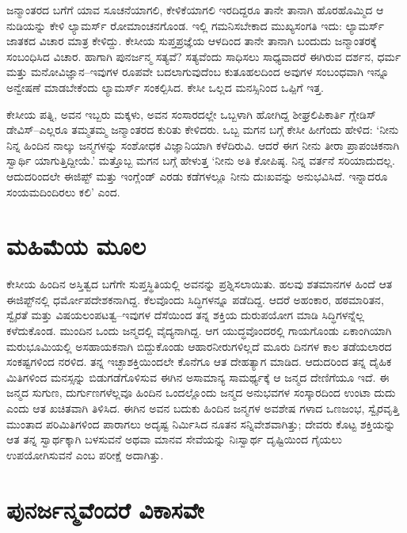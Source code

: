 ಜನ್ಮಾಂತರದ ಬಗೆಗೆ ಯಾವ ಸೂಚನೆಯಾಗಲಿ, ಕೇಳಿಕೆಯಾಗಲಿ ಇರದಿದ್ದರೂ ತಾನೇ ತಾನಾಗಿ ಹೊರಹೊಮ್ಮಿದ ಆ ನುಡಿಯನ್ನು ಕೇಳಿ ಲ್ಯಾಮರ್ಸ್ ರೋಮಾಂಚನಗೊಂಡ. ಇಲ್ಲಿ ಗಮನಿಸಬೇಕಾದ ಮುಖ್ಯಸಂಗತಿ ಇದು: ಲ್ಯಾಮರ್ಸ್ ಜಾತಕದ ವಿಚಾರ ಮಾತ್ರ ಕೇಳಿದ್ದು. ಕೇಸೀಯ ಸುಪ್ತಪ್ರಜ್ಞೆಯ ಆಳದಿಂದ ತಾನೇ ತಾನಾಗಿ ಬಂದುದು ಜನ್ಮಾಂತರಕ್ಕೆ ಸಂಬಂಧಿಸಿದ ವಿಚಾರ. ಹಾಗಾಗಿ ಪುನರ್ಜನ್ಮ ಸತ್ಯವೆ? ಸತ್ಯವೆಂದು ಸಾಧಿಸಲು ಸಾಧ್ಯವಾದರೆ ಈಗಿರುವ ದರ್ಶನ, ಧರ್ಮ ಮತ್ತು ಮನೋವಿಜ್ಞಾನ–ಇವುಗಳ ರೂಪವೇ ಬದಲಾಗುವುದೆಂಬ ಕುತೂಹಲದಿಂದ ಅವುಗಳ ಸಂಬಂಧವಾಗಿ ಇನ್ನೂ ಅನ್ವೇಷಣೆ ಮಾಡಬೇಕೆಂದು ಲ್ಯಾಮರ್ಸ್ ಸಂಕಲ್ಪಿಸಿದ. ಕೇಸೀ ಒಲ್ಲದ ಮನಸ್ಸಿನಿಂದ ಒಪ್ಪಿಗೆ ಇತ್ತ.

ಕೇಸೀಯ ಪತ್ನಿ, ಅವನ ಇಬ್ಬರು ಮಕ್ಕಳು, ಅವನ ಸಂಸಾರದಲ್ಲೇ ಒಬ್ಬಳಾಗಿ ಹೋಗಿದ್ದ ಶೀಘ್ರಲಿಪಿಕಾರ್ತಿ ಗ್ಲೇಡಿಸ್ ಡೇವಿಸ್​–ಎಲ್ಲರೂ ತಮ್ಮತಮ್ಮ ಜನ್ಮಾಂತರದ ಕುರಿತು ಕೇಳಿದರು. ಒಬ್ಬ ಮಗನ ಬಗ್ಗೆ ಕೇಸೀ ಹೀಗೆಂದು ಹೇಳಿದ: ‘ನೀನು ನಿನ್ನ ಹಿಂದಿನ ನಾಲ್ಕು ಜನ್ಮಗಳನ್ನು ಸಂಶೋಧಕ ವಿಜ್ಞಾನಿಯಾಗಿ ಕಳೆದಿರುವಿ. ಆದರೆ ಈಗ ನೀನು ತೀರಾ ಪ್ರಾಪಂಚಿಕನಾಗಿ ಸ್ವಾರ್ಥಿ ಯಾಗುತ್ತಿದ್ದೀಯೆ.’ ಮತ್ತೊಬ್ಬ ಮಗನ ಬಗ್ಗೆ ಹೇಳುತ್ತ ‘ನೀನು ಅತಿ ಕೋಪಿಷ್ಠ. ನಿನ್ನ ವರ್ತನೆ ಸರಿಯಾದುದಲ್ಲ. ಆದುದರಿಂದಲೇ ಈಜಿಪ್ಟ್ ಮತ್ತು ಇಂಗ್ಲೆಂಡ್ ಎರಡು ಕಡೆಗಳಲ್ಲೂ ನೀನು ದುಃಖವನ್ನು ಅನುಭವಿಸಿದೆ. ಇನ್ನಾದರೂ ಸಂಯಮದಿಂದಿರಲು ಕಲಿ’ ಎಂದ.


\section{ಮಹಿಮೆಯ ಮೂಲ}

ಕೇಸೀಯ ಹಿಂದಿನ ಅಸ್ತಿತ್ವದ ಬಗೆಗೇ ಸುಪ್ತಸ್ಥಿತಿಯಲ್ಲಿ ಅವನನ್ನು ಪ್ರಶ್ನಿಸಲಾಯಿತು. ಹಲವು ಶತಮಾನಗಳ ಹಿಂದೆ ಆತ ಈಜಿಪ್ಟ್​ನಲ್ಲಿ ಧರ್ಮೋಪದೇಶಕನಾಗಿದ್ದ. ಕೆಲವೊಂದು ಸಿದ್ಧಿಗಳನ್ನೂ ಪಡೆದಿದ್ದ. ಆದರೆ ಅಹಂಕಾರ, ಹಠಮಾರಿತನ, ಸ್ವೈರತೆ ಮತ್ತು ವಿಷಯಲಂಪಟತ್ವ–ಇವುಗಳ ದೆಸೆಯಿಂದ ತನ್ನ ಶಕ್ತಿಯ ದುರುಪಯೋಗ ಮಾಡಿ ಸಿದ್ಧಿಗಳನ್ನೆಲ್ಲ ಕಳೆದುಕೊಂಡ. ಮುಂದಿನ ಒಂದು ಜನ್ಮದಲ್ಲಿ ವೈದ್ಯನಾಗಿದ್ದ. ಆಗ ಯುದ್ಧವೊಂದರಲ್ಲಿ ಗಾಯಗೊಂಡು ಏಕಾಂಗಿಯಾಗಿ ಮರುಭೂಮಿಯಲ್ಲಿ ಅಸಹಾಯಕನಾಗಿ ಬಿದ್ದುಕೊಂಡು ಆಹಾರನೀರುಗಳಿಲ್ಲದೆ ಮೂರು ದಿನಗಳ ಕಾಲ ತಡೆಯಲಾರದ ಸಂಕಷ್ಟಗಳಿಂದ ನರಳಿದ. ತನ್ನ ಇಚ್ಛಾಶಕ್ತಿಯಿಂದಲೇ ಕೊನೆಗೂ ಆತ ದೇಹತ್ಯಾಗ ಮಾಡಿದ. ಆದುದರಿಂದ ತನ್ನ ದೈಹಿಕ ಮಿತಿಗಳಿಂದ ಮನಸ್ಸನ್ನು ಬಿಡುಗಡೆಗೊಳಿಸುವ ಈಗಿನ ಅಸಾಮಾನ್ಯ ಸಾಮರ್ಥ್ಯಕ್ಕೆ ಆ ಜನ್ಮದ ದೇಣಿಗೆಯೂ ಇದೆ. ಈ ಜನ್ಮದ ಸುಗುಣ, ದುರ್ಗುಣಗಳೆಲ್ಲವೂ ಹಿಂದಿನ ಒಂದಲ್ಲೊಂದು ಜನ್ಮದ ಅನುಭವಗಳ ಸಂಸ್ಕಾರದಿಂದ ಉಂಟಾ ದುದು ಎಂದು ಆತ ಖಚಿತವಾಗಿ ತಿಳಿಸಿದ. ಈಗಿನ ಅವನ ಬದುಕು ಹಿಂದಿನ ಜನ್ಮಗಳ ಅವಶೇಷ ಗಳಾದ ಒಣಜಂಭ, ಸ್ವೈರವೃತ್ತಿ ಮುಂತಾದ ಪರಿಮಿತಿಗಳಿಂದ ಪಾರಾಗಲು ಅದೃಷ್ಟ ನಿರ್ಮಿಸಿದ ನೂತನ ಸನ್ನಿವೇಶವಾಗಿತ್ತು; ದೇವರು ಕೊಟ್ಟ ಶಕ್ತಿಯನ್ನು ಆತ ತನ್ನ ಸ್ವಾರ್ಥಕ್ಕಾಗಿ ಬಳಸುವನೆ ಅಥವಾ ಮಾನವ ಸೇವೆಯನ್ನು ನಿಃಸ್ವಾರ್ಥ ದೃಷ್ಟಿಯಿಂದ ಗೈಯಲು ಉಪಯೋಗಿಸುವನೆ ಎಂಬ ಪರೀಕ್ಷೆ ಅದಾಗಿತ್ತು.


\section{ಪುನರ್ಜನ್ಮವೆಂದರೆ ವಿಕಾಸವೇ}

